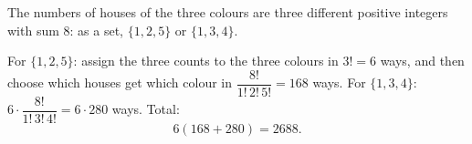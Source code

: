 The numbers of houses of the three colours are three different positive integers with sum $8$: as a set, $\{1,2,5\}$ or $\{1,3,4\}$.

For $\{1,2,5\}$: assign the three counts to the three colours in $3!=6$ ways, and then choose which houses get which colour in $\dfrac{8!}{1!\,2!\,5!}=168$ ways. For $\{1,3,4\}$: $6\cdot\dfrac{8!}{1!\,3!\,4!}=6\cdot280$ ways. Total:
\[
6(168+280)=\boxed{2688}.
\]
